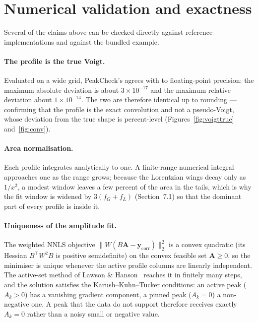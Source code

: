 \documentclass[11pt,a4paper]{article}
\begin{document}
\section{Numerical validation and exactness}
Several of the claims above can be checked directly against reference
implementations and against the bundled example.

\paragraph{The profile is the true Voigt.} Evaluated on a wide grid, PeakCheck's
 agrees with  to floating-point
precision: the maximum absolute deviation is about $3\times10^{-17}$ and the
maximum relative deviation about $1\times10^{-14}$. The two are therefore
identical up to rounding --- confirming that the profile is the exact convolution
and not a pseudo-Voigt, whose deviation from the true shape is percent-level
(Figures~\ref{fig:voigttrue} and~\ref{fig:conv}).

\paragraph{Area normalisation.} Each profile integrates analytically to one. A
finite-range numerical integral approaches one as the range grows; because the
Lorentzian wings decay only as $1/x^2$, a modest window leaves a few percent of
the area in the tails, which is why the fit window is widened by $3(f_G+f_L)$
(Section~7.1) so that the dominant part of every profile is inside it.

\paragraph{Uniqueness of the amplitude fit.} The weighted NNLS objective
$\lVert W(B\mathbf{A}-\mathbf{y}_\text{corr})\rVert_2^2$ is a convex quadratic
(its Hessian $B^\top W^2 B$ is positive semidefinite) on the convex feasible set
$\mathbf{A}\ge 0$, so the minimiser is unique whenever the active profile columns
are linearly independent. The active-set method of Lawson \&
Hanson~\citep{LawsonHanson1995} reaches it in finitely many steps, and the
solution satisfies the Karush--Kuhn--Tucker conditions: an active peak
($A_k>0$) has a vanishing gradient component, a pinned peak ($A_k=0$) a
non-negative one. A peak that the data do not support therefore receives exactly
$A_k=0$ rather than a noisy small or negative value.
\end{document}
